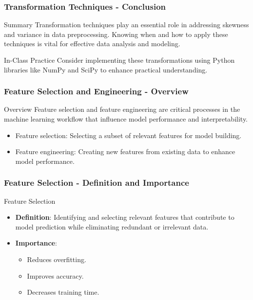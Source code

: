 \documentclass[aspectratio=169]{beamer}
\begin{document}
\begin{frame}[fragile]
    \frametitle{Transformation Techniques - Conclusion}
    \begin{block}{Summary}
        Transformation techniques play an essential role in addressing skewness and variance in data preprocessing. Knowing when and how to apply these techniques is vital for effective data analysis and modeling.
    \end{block}
    \begin{block}{In-Class Practice}
        Consider implementing these transformations using Python libraries like NumPy and SciPy to enhance practical understanding.
    \end{block}
\end{frame}

\begin{frame}
    \titlepage
\end{frame}

\begin{frame}[fragile]
    \frametitle{Feature Selection and Engineering - Overview}
    \begin{block}{Overview}
        Feature selection and feature engineering are critical processes in the machine learning workflow that influence model performance and interpretability.
    \end{block}
    \begin{itemize}
        \item Feature selection: Selecting a subset of relevant features for model building.
        \item Feature engineering: Creating new features from existing data to enhance model performance.
    \end{itemize}
\end{frame}

\begin{frame}[fragile]
    \frametitle{Feature Selection - Definition and Importance}
    \begin{block}{Feature Selection}
        \begin{itemize}
            \item \textbf{Definition}: Identifying and selecting relevant features that contribute to model prediction while eliminating redundant or irrelevant data.
            \item \textbf{Importance}:
                \begin{itemize}
                    \item Reduces overfitting.
                    \item Improves accuracy.
                    \item Decreases training time.
                \end{itemize}
        \end{itemize}
    \end{block}
\end{frame}
\end{document}

